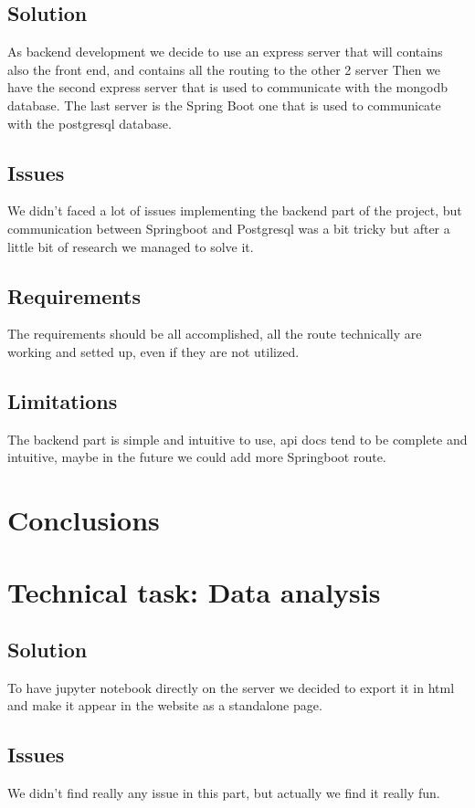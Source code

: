 \documentclass[conference]{IEEEtran}
\begin{document}
\subsection{Solution}
As backend development we decide to use an express server that will contains also the front end, and contains all the routing to the other 2 server
Then we have the second express server that is used to communicate with the mongodb database.
The last server is the Spring Boot one that is used to communicate with the postgresql database. 

\subsection{Issues}
We didn't faced a lot of issues implementing the backend part of the project, but communication between Springboot and Postgresql was a bit tricky but after a little bit of research we managed to solve it. 

\subsection{Requirements}
The requirements should be all accomplished, all the route technically are working and setted up, even if they are not utilized.

\subsection{Limitations}
The backend part is simple and intuitive to use, api docs tend to be complete and intuitive, maybe in the future we could add more Springboot route.

\section{Conclusions}

\section{Technical task: Data analysis}
\subsection{Solution}
To have jupyter notebook directly on the server we decided to export it in html and make it appear in the website as a standalone page.
\subsection{Issues}
We didn't find really any issue in this part, but actually we find it really fun.
\end{document}
